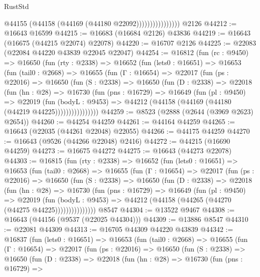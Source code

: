 \begin{lexlean}{RustStd}
\begin{coremodule}
                            @44155 (@44158 (@44169 (@44180 @22092))))))))))))))))
    @2126
@44212 := @16643 @16599
@44215 := @16683 (@16684 @2126) @43836
@44219 := @16643 (@16675 (@44215 @22074) @22078)
@44220 := @16707 @2126
@44225 := @22083 (@22084 @44220 @43839 @22045 @22047)
@44254 := @16812
    (fun (rc : @9450) =>
    @16650
      (fun (rty : @2338) =>
      @16652
        (fun (lets0 : @16651) =>
        @16653
          (fun (tail0 : @2668) =>
          @16655
            (fun (Γ : @16654) =>
            @22017
              (fun (ps : @22016) =>
              @16650
                (fun (S : @2338) =>
                @16650
                  (fun (D : @2338) =>
                  @22018
                    (fun (hn : @28) =>
                    @16730
                      (fun (pns : @16729) =>
                      @16649
                        (fun (pl : @9450) =>
                        @22019
                          (fun (bodyL : @9453) =>
                          @44212 (@44158 (@44169 (@44180 (@44219 @44225))))))))))))))))
@44259 := @8523 (@2888 (@2644 (@3969 @2623) @2654))
@44260 := @44254 @44259
@44261 := @44164 @44259
@44265 := @16643 (@22035 (@44261 @22048) @22055)
@44266 := @44175 @44259
@44270 := @16643 (@9526 (@44266 @22048) @2416)
@44272 := @44215 (@16690 @44259)
@44273 := @16675 @44272
@44275 := @16643 (@44273 @22078)
@44303 := @16815
    (fun (rty : @2338) =>
    @16652
      (fun (lets0 : @16651) =>
      @16653
        (fun (tail0 : @2668) =>
        @16655
          (fun (Γ : @16654) =>
          @22017
            (fun (ps : @22016) =>
            @16650
              (fun (S : @2338) =>
              @16650
                (fun (D : @2338) =>
                @22018
                  (fun (hn : @28) =>
                  @16730
                    (fun (pns : @16729) =>
                    @16649
                      (fun (pl : @9450) =>
                      @22019
                        (fun (bodyL : @9453) =>
                        @44212 (@44158 (@44265 (@44270 (@44275 @44225)))))))))))))))
    @8547
@44304 := @13522 @9467
@44308 := @16643 (@44156 (@9537 (@22025 @44304)))
@44309 := @13886 @8547
@44310 := @22081 @44309
@44313 := @16705 @44309 @44220 @43839
@44342 := @16837
    (fun (lets0 : @16651) =>
    @16653
      (fun (tail0 : @2668) =>
      @16655
        (fun (Γ : @16654) =>
        @22017
          (fun (ps : @22016) =>
          @16650
            (fun (S : @2338) =>
            @16650
              (fun (D : @2338) =>
              @22018
                (fun (hn : @28) =>
                @16730
                  (fun (pns : @16729) =>

\end{coremodule}
\end{lexlean}
